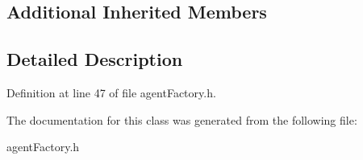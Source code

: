 \subsection*{Additional Inherited Members}


\subsection{Detailed Description}


Definition at line 47 of file agent\+Factory.\+h.



The documentation for this class was generated from the following file\+:\begin{DoxyCompactItemize}
\item 
agent\+Factory.\+h\end{DoxyCompactItemize}
